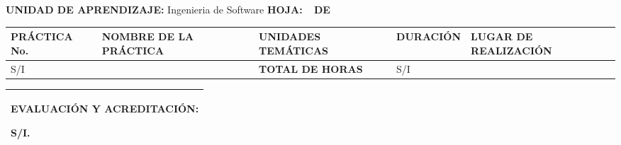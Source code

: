 \documentclass[10pt]{article}
\newcommand\tab[1][1cm]{\hspace*{#1}}
\begin{document}
\textbf{UNIDAD DE APRENDIZAJE:} Ingenieria de Software
\tab[1cm]
\textbf{HOJA: } \thepage\
\tab[0.25cm]
\textbf{DE } \pageref{LastPage}\\
\begin{center}
\end{center}
\begin{table}[H]
  \begin{tabular}{|p{}|p{}|p{}|p{}|p{}|}
    \hline
    \Centering\textbf{PRÁCTICA No.} & \Centering\textbf{NOMBRE DE LA PRÁCTICA} & \Centering\textbf{UNIDADES TEMÁTICAS} & \Centering\textbf{DURACIÓN} & \Centering\textbf{LUGAR DE REALIZACIÓN}\\
    \hline 
    S/I
    \hline &&\Centering\textbf{TOTAL DE HORAS}& S/I &\\\hline 
  \end{tabular}
  \begin{tabular}{|p{1.045\textwidth}|}
    \textbf{EVALUACIÓN Y ACREDITACIÓN:}

    S/I.\\\hline
  \end{tabular}
\end{table}


\end{document}
